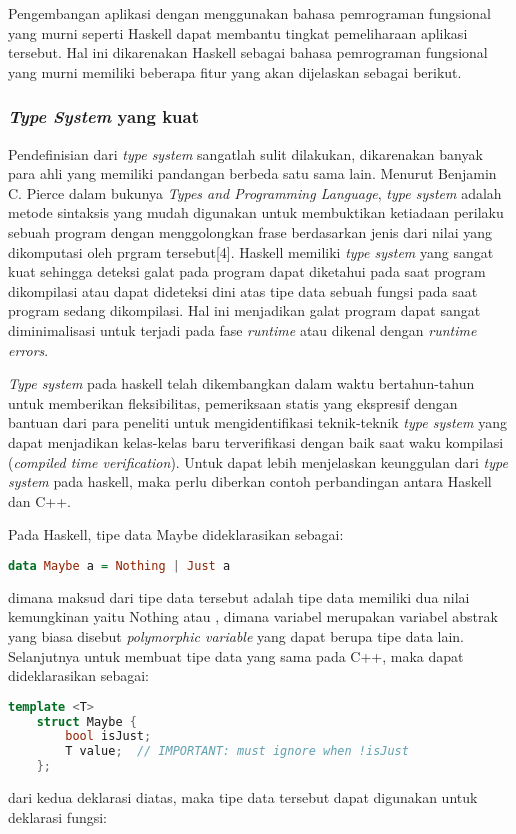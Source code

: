 \documentclass[pi.tex]{subfile}
\begin{document}
\hspace{5pt}Pengembangan aplikasi dengan menggunakan bahasa pemrograman fungsional yang murni seperti Haskell dapat membantu tingkat pemeliharaan aplikasi tersebut. Hal ini dikarenakan Haskell sebagai bahasa pemrograman fungsional yang murni memiliki beberapa fitur yang akan dijelaskan sebagai berikut.

 \subsubsection{\emph{Type System} yang kuat}\hspace{8pt}
  Pendefinisian dari \emph{type system} sangatlah sulit dilakukan, dikarenakan banyak para ahli yang memiliki pandangan berbeda satu sama lain. Menurut Benjamin C. Pierce dalam bukunya \emph{Types and Programming Language}, \emph{type system} adalah metode sintaksis yang mudah digunakan untuk membuktikan ketiadaan perilaku sebuah program dengan menggolongkan frase berdasarkan jenis dari nilai yang dikomputasi oleh prgram tersebut[4]. Haskell memiliki \emph{type system} yang sangat kuat sehingga deteksi galat pada program dapat diketahui pada saat program dikompilasi atau dapat dideteksi dini atas tipe data sebuah fungsi pada saat program sedang dikompilasi. Hal ini menjadikan galat program dapat sangat diminimalisasi untuk terjadi pada fase \emph{runtime} atau dikenal dengan \emph{runtime errors}.

  \hspace{8pt}\emph{Type system} pada haskell telah dikembangkan dalam waktu bertahun-tahun untuk memberikan fleksibilitas, pemeriksaan statis yang ekspresif dengan bantuan dari para peneliti untuk mengidentifikasi teknik-teknik \emph{type system} yang dapat menjadikan kelas-kelas baru terverifikasi dengan baik saat waku kompilasi (\emph{compiled time verification}). Untuk dapat lebih menjelaskan keunggulan dari \emph{type system} pada haskell, maka perlu diberkan contoh perbandingan antara Haskell dan C++.

  \hspace{8pt}Pada Haskell, tipe data Maybe dideklarasikan sebagai:\\
  \begin{lstlisting}[language=Haskell]
    data Maybe a = Nothing | Just a
  \end{lstlisting}
  dimana maksud dari tipe data tersebut adalah tipe data  memiliki dua nilai kemungkinan yaitu Nothing atau , dimana variabel  merupakan variabel abstrak yang biasa disebut \emph{polymorphic variable} yang dapat berupa tipe data lain. Selanjutnya untuk membuat tipe data yang sama pada C++, maka dapat dideklarasikan sebagai:\\
  \hspace{8pt}\begin{lstlisting}[language=C++]
    template <T>
    struct Maybe {
        bool isJust;
        T value;  // IMPORTANT: must ignore when !isJust
    };
  \end{lstlisting}
 dari kedua deklarasi diatas, maka tipe data tersebut dapat digunakan untuk deklarasi fungsi:
\end{document}
